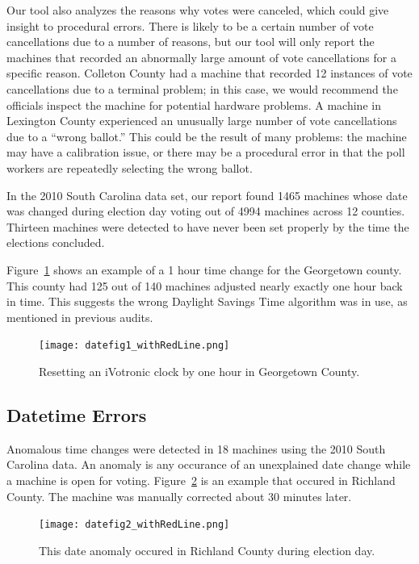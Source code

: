Our tool also analyzes the reasons why votes were canceled, which
could give insight to procedural errors.  There is likely to be a
certain number of vote cancellations due to a number of reasons, but
our tool will only report the machines that recorded an abnormally
large amount of vote cancellations for a specific reason.  Colleton
County had a machine that recorded 12 instances of vote cancellations
due to a terminal problem; in this case, we would recommend the
officials inspect the machine for potential hardware problems.  A
machine in Lexington County experienced an unusually large number of
vote cancellations due to a \textquotedblleft wrong ballot.'' This
could be the result of many problems: the machine may have a
calibration issue, or there may be a procedural error in that the poll
workers are repeatedly selecting the wrong ballot.

In the 2010 South Carolina data set, our report found 1465 machines
whose date 
was changed during election day voting out of 4994 machines across 12
counties. Thirteen  machines were detected to
have never been set properly by the time the elections concluded.

Figure~\ref{fig:Georgetown} shows an example of a 1 hour time change for the
Georgetown county.  This county had 125 out of 140 machines adjusted nearly
exactly one hour back in time.  This suggests the wrong Daylight Savings Time
algorithm was in use, as mentioned in previous audits.~\cite{Buell2011}
\begin{figure}[h!]
  \caption{Resetting an iVotronic clock by one hour in Georgetown
County.}
  \label{fig:Georgetown}
  \centering
    \texttt{[image: datefig1\_withRedLine.png]}
\end{figure}

\smvertspace
\subsection{Datetime Errors}
Anomalous time changes were detected in 18 machines using the 2010 South
Carolina data.  An anomaly is any occurance of an unexplained date
change while a machine is open for voting. Figure~\ref{fig:Richland}
is an example that occured in Richland County.  The machine was manually
corrected about 30 minutes later.
\begin{figure}[h!]
  \caption{This date anomaly occured in Richland County during election day.}
  \label{fig:Richland}
  \centering
    \texttt{[image: datefig2\_withRedLine.png]}
\end{figure}

